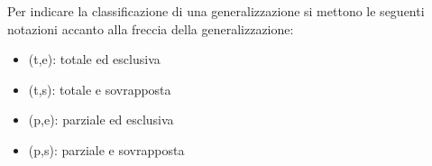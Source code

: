 \documentclass[a4paper]{article}
\begin{document}
\vspace{1em}
\noindent
Per indicare la classificazione di una generalizzazione si mettono le seguenti
notazioni accanto alla freccia della generalizzazione:
\begin{itemize}
  \item (t,e): totale ed esclusiva
  \item (t,s): totale e sovrapposta
  \item (p,e): parziale ed esclusiva
  \item (p,s): parziale e sovrapposta
\end{itemize}
\end{document}
